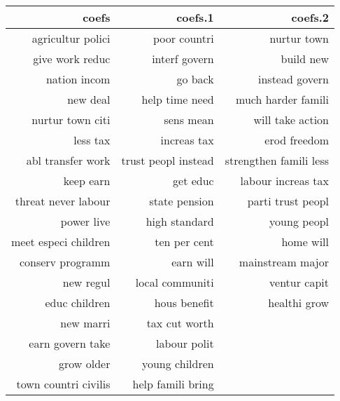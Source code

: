 \begingroup\small
\begin{tabular}{r|r|r}
  \hline
coefs & coefs.1 & coefs.2 \\ 
  \hline
agricultur polici & poor countri & nurtur town \\ 
  give work reduc & interf govern & build new \\ 
  nation incom & go back & instead govern \\ 
  new deal & help time need & much harder famili \\ 
  nurtur town citi & sens mean & will take action \\ 
  less tax & increas tax & erod freedom \\ 
  abl transfer work & trust peopl instead & strengthen famili less \\ 
  keep earn & get educ & labour increas tax \\ 
  threat never labour & state pension & parti trust peopl \\ 
  power live & high standard & young peopl \\ 
  meet especi children & ten per cent & home will \\ 
  conserv programm & earn will & mainstream major \\ 
  new regul & local communiti & ventur capit \\ 
  educ children & hous benefit & healthi grow \\ 
  new marri & tax cut worth &  \\ 
  earn govern take & labour polit &  \\ 
  grow older & young children &  \\ 
  town countri civilis & help famili bring &  \\ 
   \hline
\end{tabular}
\endgroup
